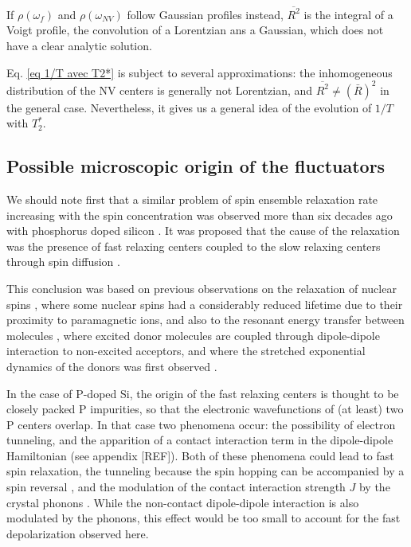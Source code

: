 \documentclass[a4paper,11pt]{report}
\begin{document}
\begin{refsection}
If $\rho(\omega_{f})$ and $\rho(\omega_{NV})$ follow Gaussian profiles instead, $\overline{R^2}$ is the integral of a Voigt profile, the convolution of a Lorentzian ans a Gaussian, which does not have a clear analytic solution.

Eq. \ref{eq 1/T avec T2*} is subject to several approximations: the inhomogeneous distribution of the NV centers is generally not Lorentzian, and $\overline{R^2} \neq (\bar{R})^2$ in the general case. Nevertheless, it gives us a general idea of the evolution of $1/T$ with $T_2^*$.

 \subsection{Possible microscopic origin of the fluctuators}

We should note first that a similar problem of spin ensemble relaxation rate increasing with the spin concentration was observed more than six decades ago with phosphorus doped silicon \citep{feher1959electron,honig1960electron}. It was proposed that the cause of the relaxation was the presence of fast relaxing centers coupled to the slow relaxing centers through spin diffusion \citep{honig1960electron, sugihara1963spin, yang1968concentration, vugmeister1978spin, berman2005spin}. 

This conclusion was based on previous observations on the relaxation of nuclear spins \citep{bloembergen1949interaction, de1958relaxation, blumberg1960nuclear}, where some nuclear spins had a considerably reduced lifetime due to their proximity to paramagnetic ions, and also to the resonant energy transfer between molecules \citep{forster1949experimentelle, eisenthal1964influence, yokota1967effects}, where excited donor molecules are coupled through dipole-dipole interaction to non-excited acceptors, and where the stretched exponential dynamics of the donors was first observed \citep{forster1949experimentelle}.

In the case of P-doped Si, the origin of the fast relaxing centers is thought to be closely packed P impurities, so that the electronic wavefunctions of (at least) two P centers overlap. In that case two phenomena occur: the possibility of electron tunneling, and the apparition of a contact interaction term in the dipole-dipole Hamiltonian (see appendix [REF]). Both of these phenomena could lead to fast spin relaxation, the tunneling because the spin hopping can be accompanied by a spin reversal \citep{sugihara1963spin}, and the modulation of the contact interaction strength $J$ by the crystal phonons \citep{honig1960electron}. While the non-contact dipole-dipole interaction is also modulated by the phonons, this effect would be too small to account for the fast depolarization observed here.


\end{refsection}
\end{document}
